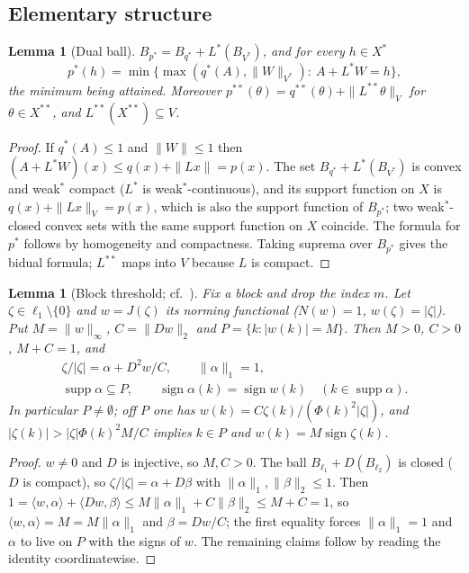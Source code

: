 \documentclass[10pt]{amsart}
\newtheorem{lemma}[theorem]{Lemma}
\theoremstyle{definition}
\theoremstyle{remark}
\newcommand{\supp}{\operatorname{supp}}
\newcommand{\sgn}{\operatorname{sign}}
\newcommand{\ip}[2]{\langle #1,#2\rangle}
\begin{document}
\subsection{Elementary structure}

\begin{lemma}[Dual ball]\label{lem:dualball}
$B_{p^*}=B_{q^*}+L^*(B_{V^*})$, and for every $h\in X^*$
\[
 p^*(h)=\min\{\max(q^*(A),\|W\|_{V^*}):\ A+L^*W=h\},
\]
the minimum being attained.  Moreover $p^{**}(\theta)=q^{**}(\theta)+
\|L^{**}\theta\|_V$ for $\theta\in X^{**}$, and $L^{**}(X^{**})\subseteq V$.
\end{lemma}

\begin{proof}
If $q^*(A)\le1$ and $\|W\|\le1$ then $(A+L^*W)(x)\le q(x)+\|Lx\|=p(x)$.
The set $B_{q^*}+L^*(B_{V^*})$ is convex and weak$^*$ compact ($L^*$ is
weak$^*$-continuous), and its support function on $X$ is
$q(x)+\|Lx\|_V=p(x)$, which is also the support function of $B_{p^*}$; two
weak$^*$-closed convex sets with the same support function on $X$
coincide.  The formula for $p^*$ follows by homogeneity and compactness.
Taking suprema over $B_{p^*}$ gives the bidual formula; $L^{**}$ maps into
$V$ because $L$ is compact.
\end{proof}

\begin{lemma}[Block threshold; cf.\ {\cite[Lemma~6.5]{PrB}}]\label{lem:threshold}
Fix a block and drop the index $m$.  Let $\zeta\in\ell_1\setminus\{0\}$ and
$w=J(\zeta)$ its norming functional ($N(w)=1$, $w(\zeta)=|\zeta|$).  Put
$M=\|w\|_\infty$, $C=\|Dw\|_2$ and $P=\{k:|w(k)|=M\}$.  Then $M>0$, $C>0$,
$M+C=1$, and
\begin{gather*}
 \zeta/|\zeta|=\alpha+D^2w/C,\qquad \|\alpha\|_1=1,\\
 \supp\alpha\subseteq P,\qquad \sgn\alpha(k)=\sgn w(k)\quad(k\in\supp\alpha).
\end{gather*}
In particular $P\ne\emptyset$; off $P$ one has
$w(k)=C\zeta(k)/(\Phi(k)^2|\zeta|)$, and $|\zeta(k)|>|\zeta|\Phi(k)^2M/C$
implies $k\in P$ and $w(k)=M\sgn\zeta(k)$.
\end{lemma}

\begin{proof}
$w\neq0$ and $D$ is injective, so $M,C>0$.  The ball
$B_{\ell_1}+D(B_{\ell_2})$ is closed ($D$ is compact), so
$\zeta/|\zeta|=\alpha+D\beta$ with $\|\alpha\|_1,\|\beta\|_2\le1$.  Then
$1=\ip{w}{\alpha}+\ip{Dw}{\beta}\le M\|\alpha\|_1+C\|\beta\|_2\le M+C=1$,
so $\ip{w}{\alpha}=M=M\|\alpha\|_1$ and $\beta=Dw/C$; the first equality
forces $\|\alpha\|_1=1$ and $\alpha$ to live on $P$ with the signs of $w$.
The remaining claims follow by reading the identity coordinatewise.
\end{proof}
\end{document}
